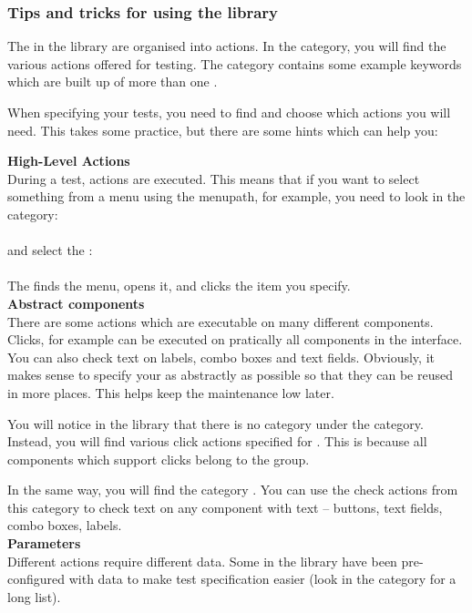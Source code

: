 \subsubsection{Tips and tricks for using the \gdcase{} library}
\label{UnderstandingLibrary}
The \gdcases{} in the library are organised into actions. In the  category, you will find the various actions offered for testing. The  category contains some example keywords which are built up of more than one \gdcase{}. 

When specifying your tests, you need to find and choose which actions you will need. This takes some practice, but there are some hints which can help you:

\textbf{High-Level Actions}\\
During a test,  actions are executed. This means that if you want to select something from a menu using the menupath, for example, you need to look in the category:\\
\\
and select the \gdcase{}:\\
\\
The \gdcase{} finds the menu, opens it, and clicks the item you specify. \\

\textbf{Abstract components}\\
There are some actions which are executable on many different components. Clicks, for example can be executed on pratically all components in the interface. You can also check text on labels, combo boxes and text fields. Obviously, it makes sense to specify your \gdcases{} as abstractly as possible so that they can be reused in more places. This helps keep the maintenance low later. 

You will notice in the library that there is no  category under the  category. Instead, you will find various click actions specified for . This is because all components which support clicks belong to the  group. 

In the same way, you will find the category . You can use the check actions from this category to check text on any component with text -- buttons, text fields, combo boxes, labels. \\

\textbf{Parameters}\\
Different actions require different data. Some \gdcases{} in the library have been pre-configured with data to make test specification easier (look in the category  for a long list). 

